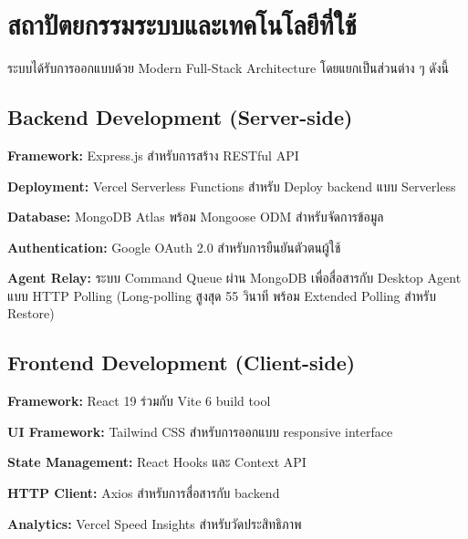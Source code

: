 \hspace*{1.3em} %

\hspace*{1.3em} %

\hspace*{1.3em} %

\hspace*{1.3em} %

\section{สถาปัตยกรรมระบบและเทคโนโลยีที่ใช้}

\hspace*{1.3em} %
ระบบได้รับการออกแบบด้วย Modern Full-Stack Architecture โดยแยกเป็นส่วนต่าง ๆ ดังนี้

\subsection{Backend Development (Server-side)}
\begin{mycustomitem2}
    \item \textbf{Framework:} Express.js สำหรับการสร้าง RESTful API
    \item \textbf{Deployment:} Vercel Serverless Functions สำหรับ Deploy backend แบบ Serverless
    \item \textbf{Database:} MongoDB Atlas พร้อม Mongoose ODM สำหรับจัดการข้อมูล
    \item \textbf{Authentication:} Google OAuth 2.0 สำหรับการยืนยันตัวตนผู้ใช้
    \item \textbf{Agent Relay:} ระบบ Command Queue ผ่าน MongoDB เพื่อสื่อสารกับ Desktop Agent แบบ HTTP Polling (Long-polling สูงสุด 55 วินาที พร้อม Extended Polling สำหรับ Restore)
\end{mycustomitem2}

\subsection{Frontend Development (Client-side)}
\begin{mycustomitem2}
    \item \textbf{Framework:} React 19 ร่วมกับ Vite 6 build tool
    \item \textbf{UI Framework:} Tailwind CSS สำหรับการออกแบบ responsive interface
    \item \textbf{State Management:} React Hooks และ Context API
    \item \textbf{HTTP Client:} Axios สำหรับการสื่อสารกับ backend
    \item \textbf{Analytics:} Vercel Speed Insights สำหรับวัดประสิทธิภาพ
\end{mycustomitem2}

